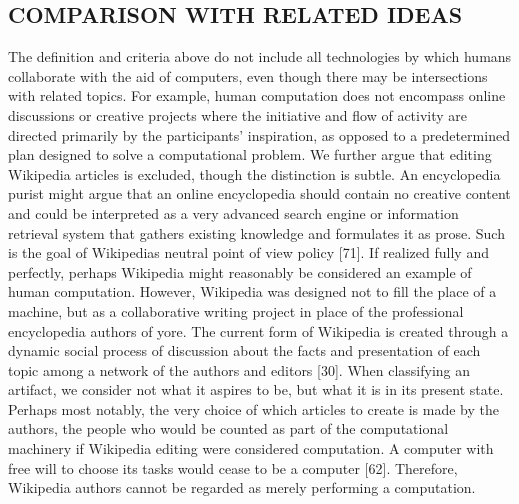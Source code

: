 \documentclass{sig-alternate}
\begin{document}
\subsection*{COMPARISON WITH RELATED IDEAS}
The definition and criteria above do not include all technologies by which humans collaborate with the aid of computers, even though there may be intersections with related topics. For example, human computation does not encompass online discussions or creative projects where the initiative and flow of activity are directed primarily by the participants’ inspiration, as opposed to a predetermined plan designed to solve a computational problem.
We further argue that editing Wikipedia articles is excluded, though the distinction is subtle. An encyclopedia purist might argue that an online encyclopedia should contain no creative content and could be interpreted as a very advanced search engine or information retrieval system that gathers existing knowledge and formulates it as prose. Such is the goal of Wikipedias  neutral point of view policy [71]. If realized fully and perfectly, perhaps Wikipedia might reasonably be considered an example of human computation. However, Wikipedia was designed not to fill the place of a machine, but as a collaborative writing project in place of the professional encyclopedia authors of yore. The current form of Wikipedia is created through a dynamic social process of discussion about the facts and presentation of each topic among a network of the authors and editors [30]. When classifying an artifact, we consider not what it aspires to be, but what it is in its present state.
Perhaps most notably, the very choice of which articles to create is made by the authors, the people who would be counted as part of the computational machinery if Wikipedia editing were considered computation. A computer with free will to choose its tasks would cease to be a computer [62]. Therefore, Wikipedia authors cannot be regarded as merely performing a computation.
\end{document}
